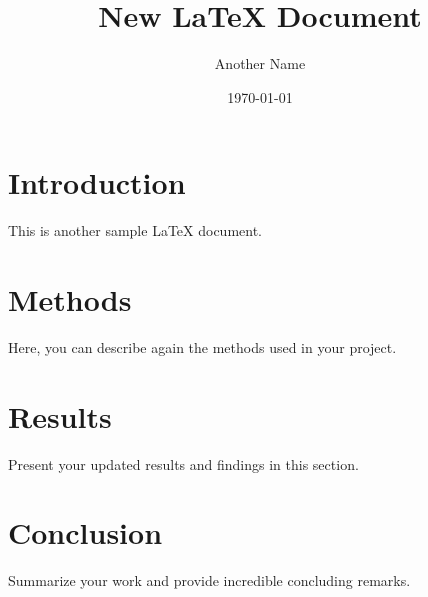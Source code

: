 \documentclass{article}
\begin{document}
\title{New LaTeX Document}
\author{Another Name}
\date{\today}

\maketitle

\section{Introduction}
This is another sample LaTeX document.

\section{Methods}
Here, you can describe again the methods used in your project.

\section{Results}
Present your updated results and findings in this section.

\section{Conclusion}
Summarize your work and provide incredible concluding remarks.
\end{document}
